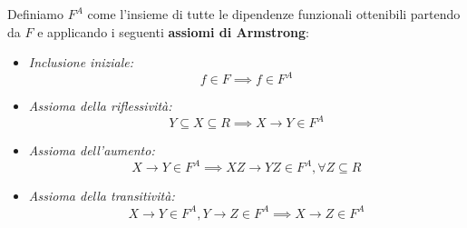 \begin{redbar}
    Definiamo $F^A$ come l'insieme di tutte le dipendenze funzionali ottenibili partendo da $F$ e applicando i seguenti \textbf{assiomi di Armstrong}:
    \begin{itemize}
        \item \textit{Inclusione iniziale:}\begin{equation*}f\in F\implies f\in F^A\end{equation*}
        \item \textit{Assioma della riflessività:}\begin{equation*}Y\subseteq X\subseteq R\implies X\to Y\in F^A\end{equation*}
        \item \textit{Assioma dell'aumento:}\begin{equation*}X\to Y\in F^A\implies XZ\to YZ\in F^A, \forall Z\subseteq R\end{equation*}
        \item \textit{Assioma della transitività:}\begin{equation*}X\to Y\in F^A, Y\to Z\in F^A\implies X\to Z\in F^A\end{equation*}
    \end{itemize}
\end{redbar}

